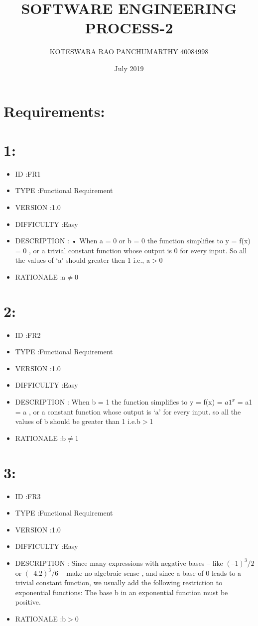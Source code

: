 \documentclass{report}
\title{SOFTWARE ENGINEERING PROCESS-2}
\author{KOTESWARA RAO PANCHUMARTHY 40084998 }
\date{July 2019}
\begin{document}
\maketitle

\section*{Requirements:}
\section*{1:}
\begin{itemize}
  \item ID			:FR1
  \item TYPE		:Functional Requirement
  \item VERSION		:1.0
  \item DIFFICULTY	:Easy
  \item DESCRIPTION	: •	When  a = 0  or  b = 0  the function simplifies to  y = f(x) = 0 , or a trivial constant function whose output is  0  for every input. So all the values of ‘a’  should greater then 1 i.e., a$>$0
  \item RATIONALE   :a$\neq$0
\end{itemize}
\section*{2:}
\begin{itemize}
  \item ID			:FR2
  \item TYPE		:Functional Requirement
  \item VERSION		:1.0
  \item DIFFICULTY	:Easy
  \item DESCRIPTION	: When  b = 1  the function simplifies to  y = f(x) = $a1^x$ = a1 = a , or a constant function whose output is  ‘a’  for every input. so all the values of b should be greater than 1 i.e.b$>$1
  \item RATIONALE   :b$\neq$1
\end{itemize}

\section*{3:}
\begin{itemize}
  \item ID			:FR3
  \item TYPE		:Functional Requirement
  \item VERSION		:1.0
  \item DIFFICULTY	:Easy
  \item DESCRIPTION	: Since many expressions with negative bases – like  $(–1)^3/2$  or  $(–4.2)^3/6$ – make no algebraic sense , and since a base of  0  leads to a trivial constant function, we usually add the following restriction to exponential functions: The base  b  in an exponential function must be positive.
  \item RATIONALE   :b$>$0
\end{itemize}
\end{document}
